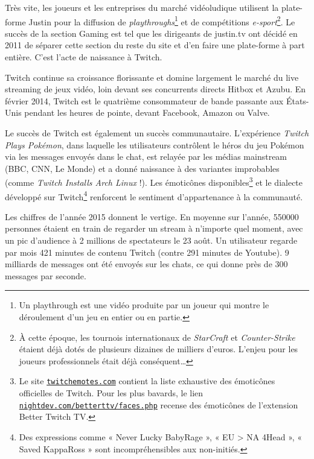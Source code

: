 \documentclass[a4paper]{article}
\begin{document}
Très vite, les joueurs et les entreprises du marché vidéoludique utilisent la plate-forme Justin pour la diffusion de \textit{playthroughs}\footnote{Un playthrough est une vidéo produite par un joueur qui montre le déroulement d'un jeu en entier ou en partie.} et de compétitions \textit{e-sport}\footnote{À cette époque, les tournois internationaux de \textit{StarCraft} et \textit{Counter-Strike} étaient déjà dotés de plusieurs dizaines de milliers d'euros. L'enjeu pour les joueurs professionnels était déjà conséquent\ldots}. Le succès de la section Gaming est tel que les dirigeants de justin.tv ont décidé en 2011 de séparer cette section du reste du site et d'en faire une plate-forme à part entière. C'est l'acte de naissance à Twitch.

Twitch continue sa croissance florissante et domine largement le marché du live streaming de jeux vidéo, loin devant ses concurrents directs Hitbox et Azubu. En février 2014, Twitch est le quatrième consommateur de bande passante aux États-Unis pendant les heures de pointe, devant Facebook, Amazon ou Valve\cite{Polygon2014}. 

Le succès de Twitch est également un succès communautaire. L'expérience \textit{Twitch Plays Pokémon}, dans laquelle les utilisateurs contrôlent le héros du jeu Pokémon via les messages envoyés dans le chat, est relayée par les médias mainstream (BBC, CNN, Le Monde) et a donné naissance à des variantes improbables (comme \textit{Twitch Installs Arch Linux} !). Les émoticônes disponibles\footnote{Le site \href{https://twitchemotes.com/}{\texttt{twitchemotes.com}} contient la liste exhaustive des émoticônes officielles de Twitch. Pour les plus bavards, le lien \href{https://nightdev.com/betterttv/faces.php}{\texttt{nightdev.com/betterttv/faces.php}} recense des émoticônes de l'extension Better Twitch TV.} et le dialecte développé sur Twitch\footnote{Des expressions comme « Never Lucky BabyRage », « EU > NA 4Head », « Saved KappaRoss » sont incompréhensibles aux non-initiés.} renforcent le sentiment d'appartenance à la communauté.

Les chiffres de l'année 2015 donnent le vertige. En moyenne sur l'année, 550000 personnes étaient en train de regarder un stream à n'importe quel moment, avec un pic d'audience à 2 millions de spectateurs le 23 août. Un utilisateur regarde par mois 421 minutes de contenu Twitch (contre 291 minutes de Youtube). 9 milliards de messages ont été envoyés sur les chats, ce qui donne près de 300 messages par seconde\cite{Retro2015}.
\end{document}
